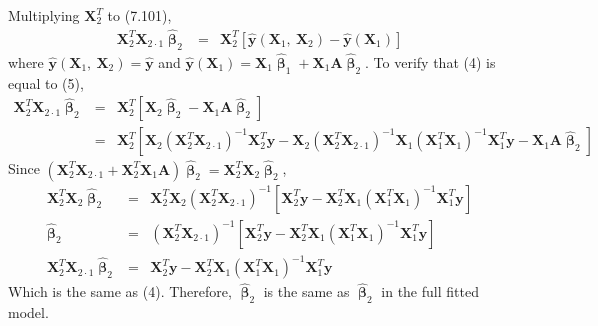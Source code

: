 \documentclass[12pt]{article} %
\begin{document}
\begin{enumerate}
\begin{enumerate}
 	  Multiplying $\mathbf{X}_{2}^{T}$ to (7.101),  
 	  \begin{eqnarray}
 	   	\mathbf{X}_{2}^{T}\mathbf{X}_{2\cdot 1}\hat{\pmb{\upbeta}}_{2}&=&
 	   	\mathbf{X}_{2}^{T}[\hat{\mathbf{y}}(\mathbf{X}_{1},~\mathbf{X}_{2})-\hat{\mathbf{y}}(\mathbf{X}_{1})]
 	  \end{eqnarray} 	  
 	  where $\hat{\mathbf{y}}(\mathbf{X}_{1},~\mathbf{X}_{2})=\hat{\mathbf{y}} $
 	  and
 	  $\hat{\mathbf{y}}(\mathbf{X}_{1})=\mathbf{X}_{1}\hat{\pmb{\upbeta}}_{1}
 	  +\mathbf{X}_{1}\mathbf{A}\hat{\pmb{\upbeta}}_{2}
 	  $. To verify that (4) is equal to (5),  	  
 	  \begin{eqnarray*}
 	   	\mathbf{X}_{2}^{T}\mathbf{X}_{2\cdot 1}\hat{\pmb{\upbeta}}_{2}&=&
 	   	\mathbf{X}_{2}^{T}[\mathbf{X}_{2}\hat{\pmb{\upbeta}}_{2}-\mathbf{X}_{1}\mathbf{A}\hat{\pmb{\upbeta}}_{2}]\\
 	   	&=&
 	   	\mathbf{X}_{2}^{T}[\mathbf{X}_{2}(\mathbf{X}_{2}^{T}\mathbf{X}_{2\cdot
 	   	1})^{-1}\mathbf{X}_{2}^{T}\mathbf{y}-\mathbf{X}_{2}(\mathbf{X}_{2}^{T}\mathbf{X}_{2\cdot
 	   	1})^{-1}\mathbf{X}_{1}
 	   (\mathbf{X}_{1}^{T}\mathbf{X}_{1})^{-1}\mathbf{X}_{1}^{T}\mathbf{y}-\mathbf{X}_{1}\mathbf{A}\hat{\pmb{\upbeta}}_{2}]
 	  \end{eqnarray*}
 	  Since $(\mathbf{X}_{2}^{T}\mathbf{X}_{2\cdot
 	  1}+\mathbf{X}_{2}^{T}\mathbf{X}_{1}\mathbf{A})\hat{\pmb{\upbeta}}_{2}=\mathbf{X}_{2}^{T}\mathbf{X}_{2}
 	  \hat{\pmb{\upbeta}}_{2}$, 
 	  \begin{eqnarray*}
 	   \mathbf{X}_{2}^{T}\mathbf{X}_{2}\hat{\pmb{\upbeta}}_{2}&=&
 	   \mathbf{X}_{2}^{T}\mathbf{X}_{2}(\mathbf{X}_{2}^{T}\mathbf{X}_{2\cdot
 	   	1})^{-1}[\mathbf{X}_{2}^{T}\mathbf{y}-\mathbf{X}_{2}^{T}\mathbf{X}_{1}
 	   (\mathbf{X}_{1}^{T}\mathbf{X}_{1})^{-1}\mathbf{X}_{1}^{T}\mathbf{y}]\\
 	  \hat{\pmb{\upbeta}}_{2}&=&(\mathbf{X}_{2}^{T}\mathbf{X}_{2\cdot
 	   	1})^{-1}[\mathbf{X}_{2}^{T}\mathbf{y}-\mathbf{X}_{2}^{T}\mathbf{X}_{1}
 	   (\mathbf{X}_{1}^{T}\mathbf{X}_{1})^{-1}\mathbf{X}_{1}^{T}\mathbf{y}]\\
 	   \mathbf{X}_{2}^{T}\mathbf{X}_{2\cdot 1}\hat{\pmb{\upbeta}}_{2}&=&
 	   \mathbf{X}_{2}^{T}\mathbf{y}-\mathbf{X}_{2}^{T}\mathbf{X}_{1}
 	   (\mathbf{X}_{1}^{T}\mathbf{X}_{1})^{-1}\mathbf{X}_{1}^{T}\mathbf{y} 	   	   
 	  \end{eqnarray*}
 	  Which is the same as (4). Therefore, $\hat{\pmb{\upbeta}}_{2}$ is the same
 	  as $\hat{\pmb{\upbeta}}_{2}$ in the full fitted model. 	  
  	\end{enumerate}

\end{enumerate}
\end{document}
